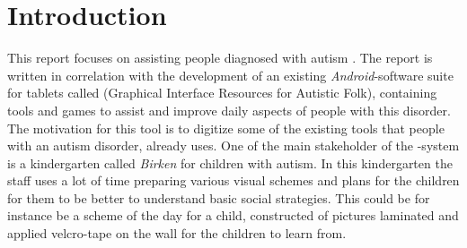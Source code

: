 \chapter{Introduction}
\label{cha:introduction}


This report focuses on assisting people diagnosed with autism . The report is written in correlation with the development of an existing \emph{Android}-software suite for tablets called \giraf(Graphical Interface Resources for Autistic Folk), containing tools and games to assist and improve daily aspects of people with this disorder. The motivation for this tool is to digitize some of the existing tools that people with an autism disorder, already uses. One of the main stakeholder of the \giraf-system is a kindergarten called \emph{Birken} for children with autism. In this kindergarten the staff uses a lot of time preparing various visual schemes and plans for the children for them to be better to understand basic social strategies. This could be for instance be a scheme of the day for a child, constructed of pictures laminated and applied velcro-tape on the wall for the children to learn from.





